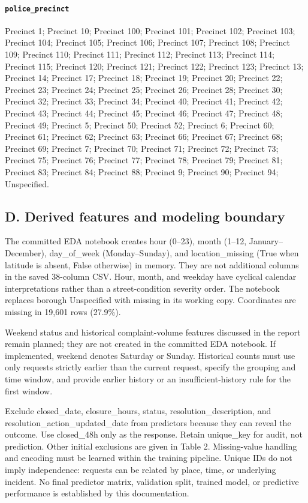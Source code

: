 \paragraph{\texttt{police\_\allowbreak{}precinct}} Precinct 1; Precinct 10; Precinct 100; Precinct 101; Precinct 102; Precinct 103; Precinct 104; Precinct 105; Precinct 106; Precinct 107; Precinct 108; Precinct 109; Precinct 110; Precinct 111; Precinct 112; Precinct 113; Precinct 114; Precinct 115; Precinct 120; Precinct 121; Precinct 122; Precinct 123; Precinct 13; Precinct 14; Precinct 17; Precinct 18; Precinct 19; Precinct 20; Precinct 22; Precinct 23; Precinct 24; Precinct 25; Precinct 26; Precinct 28; Precinct 30; Precinct 32; Precinct 33; Precinct 34; Precinct 40; Precinct 41; Precinct 42; Precinct 43; Precinct 44; Precinct 45; Precinct 46; Precinct 47; Precinct 48; Precinct 49; Precinct 5; Precinct 50; Precinct 52; Precinct 6; Precinct 60; Precinct 61; Precinct 62; Precinct 63; Precinct 66; Precinct 67; Precinct 68; Precinct 69; Precinct 7; Precinct 70; Precinct 71; Precinct 72; Precinct 73; Precinct 75; Precinct 76; Precinct 77; Precinct 78; Precinct 79; Precinct 81; Precinct 83; Precinct 84; Precinct 88; Precinct 9; Precinct 90; Precinct 94; Unspecified.

\subsection*{D. Derived features and modeling boundary}
The committed EDA notebook creates hour (0--23), month (1--12, January--December), day\_of\_week (Monday--Sunday), and location\_missing (True when latitude is absent, False otherwise) in memory. They are not additional columns in the saved 38-column CSV. Hour, month, and weekday have cyclical calendar interpretations rather than a street-condition severity order. The notebook replaces borough Unspecified with missing in its working copy. Coordinates are missing in 19,601 rows (27.9\%).

Weekend status and historical complaint-volume features discussed in the report remain planned; they are not created in the committed EDA notebook. If implemented, weekend denotes Saturday or Sunday. Historical counts must use only requests strictly earlier than the current request, specify the grouping and time window, and provide earlier history or an insufficient-history rule for the first window.

Exclude closed\_date, closure\_hours, status, resolution\_description, and resolution\_action\_updated\_date from predictors because they can reveal the outcome. Use closed\_48h only as the response. Retain unique\_key for audit, not prediction. Other initial exclusions are given in Table 2. Missing-value handling and encoding must be learned within the training pipeline. Unique IDs do not imply independence: requests can be related by place, time, or underlying incident. No final predictor matrix, validation split, trained model, or predictive performance is established by this documentation.
\endgroup
